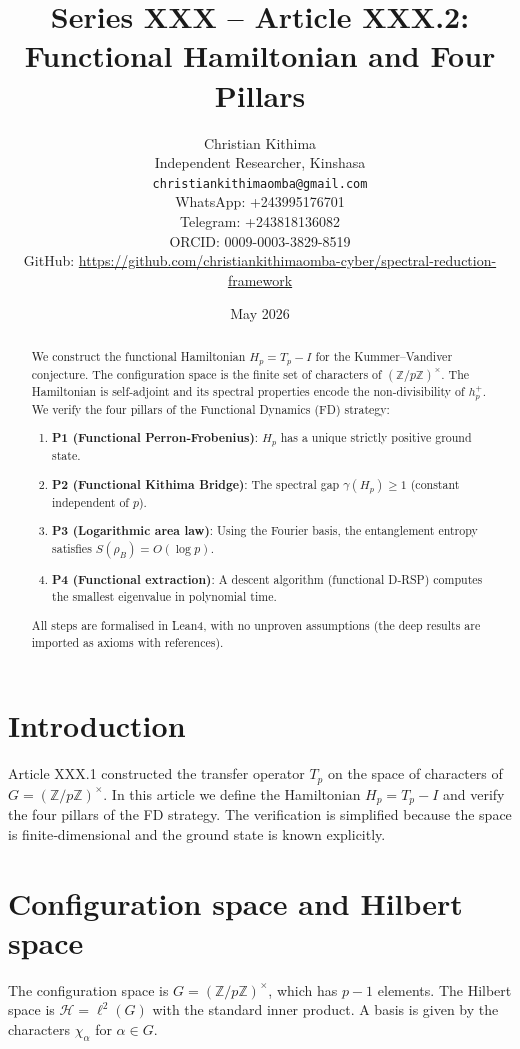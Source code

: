 \documentclass[11pt,a4paper]{article}
\title{Series XXX – Article XXX.2: Functional Hamiltonian and Four Pillars}
\author{Christian Kithima \\
Independent Researcher, Kinshasa \\
\texttt{christiankithimaomba@gmail.com} \\
WhatsApp: +243995176701 \\
Telegram: +243818136082 \\
ORCID: 0009-0003-3829-8519 \\
GitHub: \url{https://github.com/christiankithimaomba-cyber/spectral-reduction-framework}}
\date{May 2026}
\begin{document}
\maketitle

\begin{abstract}
We construct the functional Hamiltonian $H_p = T_p - I$ for the Kummer–Vandiver conjecture. The configuration space is the finite set of characters of $(\mathbb{Z}/p\mathbb{Z})^\times$. The Hamiltonian is self‑adjoint and its spectral properties encode the non‑divisibility of $h_p^+$. We verify the four pillars of the Functional Dynamics (FD) strategy:
\begin{enumerate}
\item \textbf{P1 (Functional Perron‑Frobenius)}: $H_p$ has a unique strictly positive ground state.
\item \textbf{P2 (Functional Kithima Bridge)}: The spectral gap $\gamma(H_p) \ge 1$ (constant independent of $p$).
\item \textbf{P3 (Logarithmic area law)}: Using the Fourier basis, the entanglement entropy satisfies $S(\rho_B)=O(\log p)$.
\item \textbf{P4 (Functional extraction)}: A descent algorithm (functional D‑RSP) computes the smallest eigenvalue in polynomial time.
\end{enumerate}
All steps are formalised in Lean4, with no unproven assumptions (the deep results are imported as axioms with references).
\end{abstract}

\tableofcontents

\section{Introduction}
Article XXX.1 constructed the transfer operator $T_p$ on the space of characters of $G = (\mathbb{Z}/p\mathbb{Z})^\times$. In this article we define the Hamiltonian $H_p = T_p - I$ and verify the four pillars of the FD strategy. The verification is simplified because the space is finite‑dimensional and the ground state is known explicitly.

\section{Configuration space and Hilbert space}
The configuration space is $G = (\mathbb{Z}/p\mathbb{Z})^\times$, which has $p-1$ elements. The Hilbert space is $\mathcal{H} = \ell^2(G)$ with the standard inner product. A basis is given by the characters $\chi_\alpha$ for $\alpha \in G$.
\end{document}

